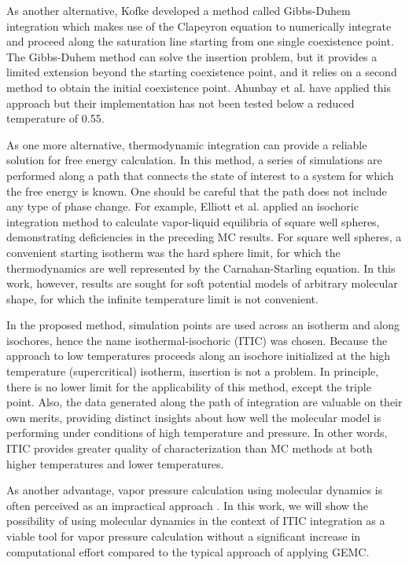 \documentclass[5p,times]{elsarticle}
\begin{document}
As another alternative, Kofke \cite{Kofke1993b} developed a method called Gibbs-Duhem integration which makes use of the Clapeyron equation to numerically integrate and proceed along the saturation line starting from one single coexistence point. The Gibbs-Duhem method can solve the insertion problem, but it provides a limited extension beyond the starting coexistence point, and it relies on a second method to obtain the initial coexistence point. Ahunbay et al. \cite{Ahunbay2004} have applied this approach but their implementation has not been tested below a reduced temperature of 0.55.

As one more alternative, thermodynamic integration can provide a reliable solution for free energy calculation. In this method, a series of simulations are performed along a path that connects the state of interest to a system for which the free energy is known. One should be careful that the path does not include any type of phase change. For example, Elliott et al. \cite{Elliott1999a} applied an isochoric integration method to calculate vapor-liquid equilibria of square well spheres, demonstrating deficiencies in the preceding MC results.  For square well spheres, a convenient starting isotherm was the hard sphere limit, for which the thermodynamics are well represented by the Carnahan-Starling equation\cite{Carnahan1969a}. In this work, however, results are sought for soft potential models of arbitrary molecular shape, for which the infinite temperature limit is not convenient. 

In the proposed method, simulation points are used across an isotherm and along isochores, hence the name isothermal-isochoric (ITIC) was chosen. Because the approach to low temperatures proceeds along an isochore initialized at the high temperature (supercritical) isotherm, insertion is not a problem. In principle, there is no lower limit for the applicability of this method, except the triple point. Also, the data generated along the path of integration are valuable on their own merits, providing distinct insights about how well the molecular model is performing under conditions of high temperature and pressure. In other words, ITIC provides greater quality of characterization than MC methods at both higher temperatures and lower temperatures.

As another advantage, vapor pressure calculation using molecular dynamics is often perceived as an impractical approach \cite{Nieto-Draghi2015}. In this work, we will show the possibility of using molecular dynamics in the context of ITIC integration as a viable tool for vapor pressure calculation without a significant increase in computational effort compared to the typical approach of applying GEMC.
 
\end{document}
